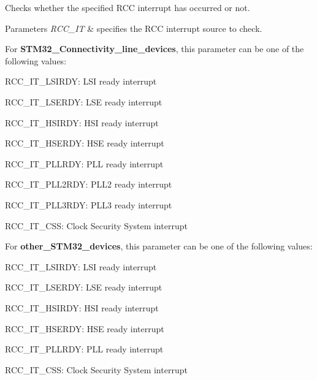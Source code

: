 Checks whether the specified R\+CC interrupt has occurred or not. 


\begin{DoxyParams}{Parameters}
{\em R\+C\+C\+\_\+\+IT} & specifies the R\+CC interrupt source to check.\\
\hline
\end{DoxyParams}
For {\bfseries{S\+T\+M32\+\_\+\+Connectivity\+\_\+line\+\_\+devices}}, this parameter can be one of the following values\+: \begin{DoxyItemize}
\item R\+C\+C\+\_\+\+I\+T\+\_\+\+L\+S\+I\+R\+DY\+: L\+SI ready interrupt \item R\+C\+C\+\_\+\+I\+T\+\_\+\+L\+S\+E\+R\+DY\+: L\+SE ready interrupt \item R\+C\+C\+\_\+\+I\+T\+\_\+\+H\+S\+I\+R\+DY\+: H\+SI ready interrupt \item R\+C\+C\+\_\+\+I\+T\+\_\+\+H\+S\+E\+R\+DY\+: H\+SE ready interrupt \item R\+C\+C\+\_\+\+I\+T\+\_\+\+P\+L\+L\+R\+DY\+: P\+LL ready interrupt \item R\+C\+C\+\_\+\+I\+T\+\_\+\+P\+L\+L2\+R\+DY\+: P\+L\+L2 ready interrupt \item R\+C\+C\+\_\+\+I\+T\+\_\+\+P\+L\+L3\+R\+DY\+: P\+L\+L3 ready interrupt\end{DoxyItemize}
\begin{DoxyItemize}
\item R\+C\+C\+\_\+\+I\+T\+\_\+\+C\+SS\+: Clock Security System interrupt\end{DoxyItemize}
For {\bfseries{other\+\_\+\+S\+T\+M32\+\_\+devices}}, this parameter can be one of the following values\+:

\begin{DoxyItemize}
\item R\+C\+C\+\_\+\+I\+T\+\_\+\+L\+S\+I\+R\+DY\+: L\+SI ready interrupt \item R\+C\+C\+\_\+\+I\+T\+\_\+\+L\+S\+E\+R\+DY\+: L\+SE ready interrupt \item R\+C\+C\+\_\+\+I\+T\+\_\+\+H\+S\+I\+R\+DY\+: H\+SI ready interrupt \item R\+C\+C\+\_\+\+I\+T\+\_\+\+H\+S\+E\+R\+DY\+: H\+SE ready interrupt \item R\+C\+C\+\_\+\+I\+T\+\_\+\+P\+L\+L\+R\+DY\+: P\+LL ready interrupt \item R\+C\+C\+\_\+\+I\+T\+\_\+\+C\+SS\+: Clock Security System interrupt\end{DoxyItemize}

